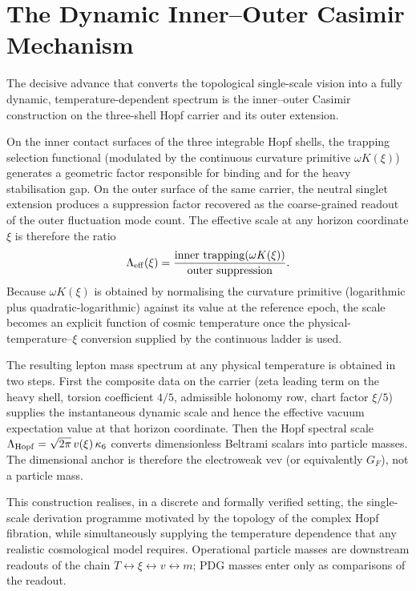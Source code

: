 \documentclass[11pt]{amsart}
\begin{document}
\section{The Dynamic Inner--Outer Casimir Mechanism}

The decisive advance that converts the topological single-scale vision into a fully dynamic, temperature-dependent spectrum is the inner--outer Casimir construction on the three-shell Hopf carrier and its outer extension.

On the inner contact surfaces of the three integrable Hopf shells, the trapping selection functional (modulated by the continuous curvature primitive $\omega K(\xi)$) generates a geometric factor responsible for binding and for the heavy stabilisation gap. On the outer surface of the same carrier, the neutral singlet extension produces a suppression factor recovered as the coarse-grained readout of the outer fluctuation mode count. The effective scale at any horizon coordinate $\xi$ is therefore the ratio
\[
\Lambda_{\rm eff}(\xi) = \frac{\text{inner trapping}(\omega K(\xi))}{\text{outer suppression}}.
\]
Because $\omega K(\xi)$ is obtained by normalising the curvature primitive (logarithmic plus quadratic-logarithmic) against its value at the reference epoch, the scale becomes an explicit function of cosmic temperature once the physical-temperature--$\xi$ conversion supplied by the continuous ladder is used.

The resulting lepton mass spectrum at any physical temperature is obtained in two steps. First the composite data on the carrier (zeta leading term on the heavy shell, torsion coefficient $4/5$, admissible holonomy row, chart factor $\xi/5$) supplies the instantaneous dynamic scale and hence the effective vacuum expectation value at that horizon coordinate. Then the Hopf spectral scale $\Lambda_{\rm Hopf}=\sqrt{2\pi}\,v(\xi)\,\kappa_6$ converts dimensionless Beltrami scalars into particle masses. The dimensional anchor is therefore the electroweak vev (or equivalently $G_F$), not a particle mass.

This construction realises, in a discrete and formally verified setting, the single-scale derivation programme motivated by the topology of the complex Hopf fibration, while simultaneously supplying the temperature dependence that any realistic cosmological model requires. Operational particle masses are downstream readouts of the chain $T\leftrightarrow \xi\leftrightarrow v\leftrightarrow m$; PDG masses enter only as comparisons of the readout.
\end{document}
